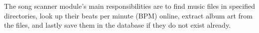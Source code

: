 

The song scanner module's main responsibilities are to find music files in specified directories, look up their beats per minute (BPM) online, extract album art from the files, and lastly save them in the database if they do not exist already.